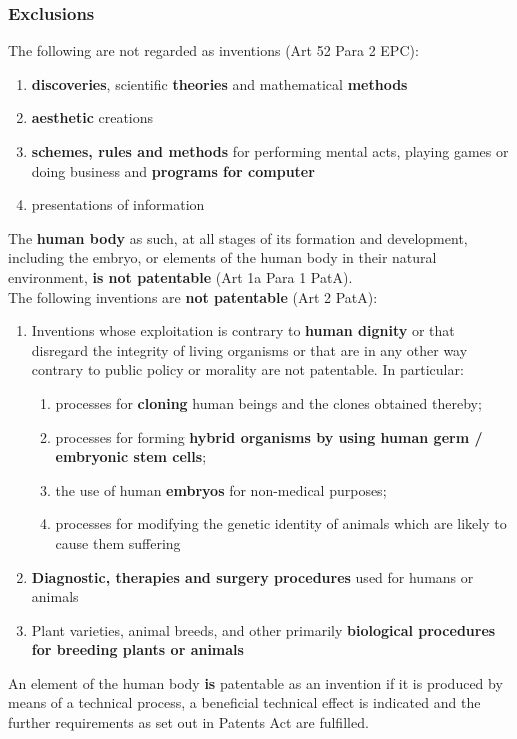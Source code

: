 \documentclass[11pt]{article}
\theoremstyle{definition}
\begin{document}
\subsubsection{Exclusions}
The following are not regarded as inventions (Art 52 Para 2 EPC):
\begin{enumerate}
	\item \textbf{discoveries}, scientific \textbf{theories} and mathematical \textbf{methods}
	\item \textbf{aesthetic} creations
	\item \textbf{schemes, rules and methods} for performing mental acts, playing games or doing business and \textbf{programs for computer}
	\item presentations of information
\end{enumerate}
The \textbf{human body} as such, at all stages of its formation and development, including the embryo, or elements of the human body in their natural environment, \textbf{is not patentable} (Art 1a Para 1 PatA).\\
The following inventions are \textbf{not patentable} (Art 2 PatA):
\begin{enumerate}
	\item Inventions whose exploitation is contrary to \textbf{human dignity} or that disregard the integrity of living organisms or that are in any other way contrary to public policy or morality are not patentable. In particular:
	\begin{enumerate}
		\item processes for \textbf{cloning} human beings and the clones obtained thereby;
		\item processes for forming \textbf{hybrid organisms by using human germ / embryonic stem cells};
		\item the use of human \textbf{embryos} for non-medical purposes;
		\item processes for modifying the genetic identity of animals which are likely to cause them suffering
	\end{enumerate}
	\item \textbf{Diagnostic, therapies and surgery procedures} used for humans or animals
	\item Plant varieties, animal breeds, and other primarily \textbf{biological procedures for breeding plants or animals}
\end{enumerate}
An element of the human body \textbf{is} patentable as an invention if it is produced by means of a technical process, a beneficial technical effect is indicated and the further requirements as set out in Patents Act are fulfilled.
\end{document}
